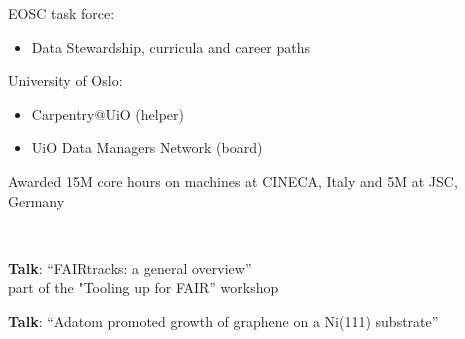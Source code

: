 \documentclass[10pt,a4paper,ragged2e,withhyper]{altacv}
\begin{document}
\begin{paracol}{2}
\divider

EOSC task force:
\begin{itemize}
\item Data Stewardship, curricula and career paths
\end{itemize}

\divider

University of Oslo:
\begin{itemize}
\item Carpentry@UiO (helper)
\item UiO Data Managers Network (board)
\end{itemize}

Awarded 15M core hours on machines at CINECA, Italy and 5M at JSC, Germany



\divider


\divider

\\
\smallskip
{}

\divider


\cvtag{\TeX}


\divider

\divider



\newpage


\textbf{Talk}: “FAIRtracks: a general overview”\\
part of the "Tooling up for FAIR'' workshop

\divider

\textbf{Talk}: “Adatom promoted growth of graphene on a Ni(111) substrate”


\end{paracol}
\end{document}
